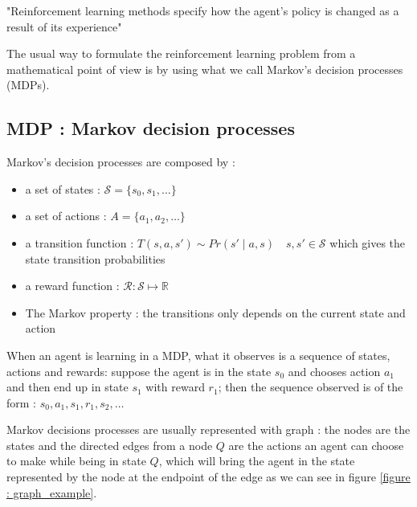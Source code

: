\documentclass[14pt,a4paper]{article}
\theoremstyle{definition}
\begin{document}
"Reinforcement learning methods specify how the agent's policy is changed as a result of its experience"\cite{Sutton}



The usual way to formulate the reinforcement learning problem from a mathematical point of view is by using what we call Markov's decision processes (MDPs).

\subsection{MDP : Markov decision processes}



Markov's decision processes are composed by : 

\begin{itemize}
\item a set of states : $\mathcal{S}=\{s_0,s_1,\ldots\}$
\item a set of actions  : $A=\{a_1,a_2,\ldots \}$
\item a transition function :  $T(s,a,s') \sim  Pr(s'\mid a, s) \quad s,s' \in \mathcal{S}$ which gives the state transition probabilities
\item a reward function : $\mathcal{R}:\mathcal{S}\mapsto \mathbb{R} $
\item The Markov property : the transitions only depends on the current state and action
\end{itemize}


When an agent is learning in a MDP, what it observes is a sequence of states, actions and rewards: suppose the agent is in the state $s_0$ and chooses action $a_1$ and then end up in state $s_1$ with reward $r_1$; then the sequence observed is of the form : $s_0,a_1,s_1,r_1,s_2,\ldots$

Markov decisions processes are usually represented with graph : the nodes are the states and the directed edges from a node $Q$ are the actions an agent can choose to make while being in state $Q$, which will bring the agent in the state represented by the node at the endpoint of the edge as we can see in figure \ref{figure : graph_example}.
\end{document}
